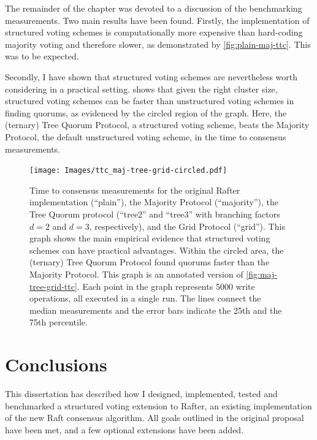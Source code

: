 \documentclass[12pt,chapterprefix=true,toc=bibliography,numbers=noendperiod,
               footnotes=multiple,twoside]{scrreprt}
\begin{document}
The remainder of the chapter was devoted to a discussion of the benchmarking measurements. Two main results have been found. Firstly, the implementation of structured voting schemes is computationally more expensive than hard-coding majority voting and therefore slower, as demonstrated by \cref{fig:plain-maj-ttc}. This was to be expected.

Secondly, I have shown that structured voting schemes are nevertheless worth considering in a practical setting.  shows that given the right cluster size, structured voting schemes can be faster than unstructured voting schemes in finding quorums, as evidenced by the circled region of the graph. Here, the (ternary) Tree Quorum Protocol, a structured voting scheme, beats the Majority Protocol, the default unstructured voting scheme, in the time to consensus measurements.

\begin{figure}[p]
    \centering
    \texttt{[image: Images/ttc\_maj-tree-grid-circled.pdf]}
    \caption{Time to consensus measurements for the original Rafter implementation (\enquote{plain}), the Majority Protocol (\enquote{majority}), the Tree Quorum protocol (\enquote{tree2} and \enquote{tree3} with branching factors \(d = 2\) and \(d = 3\), respectively), and the Grid Protocol (\enquote{grid}).
        This graph shows the main empirical evidence that structured voting schemes can have practical advantages. Within the circled area, the (ternary) Tree Quorum Protocol found quorums faster than the Majority Protocol. This graph is an annotated version of \cref{fig:maj-tree-grid-ttc}. Each point in the graph represents 5000 write operations, all executed in a single run. The lines connect the median measurements and the error bars indicate the 25th and the 75th percentile.}
    \label{fig:maj-tree-grid-ttc-circled}
\end{figure}



\chapter{Conclusions}
\label{ch:conclusions}


This dissertation has described how I designed, implemented, tested and benchmarked a structured voting extension to Rafter, an existing implementation of the new Raft consensus algorithm. All goals outlined in the original proposal have been met, and a few optional extensions have been added.
\end{document}
